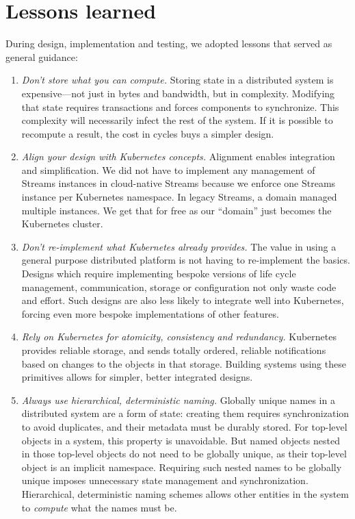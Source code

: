 \section{Lessons learned}
\label{sec:lessons}

During design, implementation and testing, we adopted lessons that
served as general guidance:

\begin{enumerate}
    \item \emph{Don't store what you can compute.} Storing state in a 
        distributed system is expensive---not just in bytes and bandwidth, 
        but in complexity. Modifying that state requires transactions and forces
        components to synchronize. This complexity will necessarily infect the 
        rest of the system. If it is possible to recompute a result, the cost in 
        cycles buys a simpler design.
    \item \emph{Align your design with Kubernetes concepts.} Alignment enables
        integration and simplification. We did not have to implement any
        management of Streams instances in cloud-native Streams because we
        enforce one Streams instance per Kubernetes namespace. In legacy
        Streams, a domain managed multiple instances. We get that for free as
        our ``domain'' just becomes the Kubernetes cluster.
    \item \emph{Don't re-implement what Kubernetes already provides.} The value 
        in using a general purpose distributed platform is not having to 
        re-implement the basics. Designs which require implementing bespoke 
        versions of life cycle management, communication, storage or 
        configuration not only waste code and effort. Such designs are also less 
        likely to integrate well into Kubernetes, forcing even more bespoke 
        implementations of other features.
    \item \emph{Rely on Kubernetes for atomicity, consistency and redundancy.} 
        Kubernetes provides reliable storage, and sends totally ordered, reliable 
        notifications based on changes to the objects in that storage. Building 
        systems using these primitives allows for simpler, better integrated 
        designs.
    \item \emph{Always use hierarchical, deterministic naming.} Globally unique 
        names in a distributed system are a form of state: creating them requires 
        synchronization to avoid duplicates, and their metadata must be durably 
        stored. For top-level objects in a system, this property is 
        unavoidable. But named objects nested in those top-level objects do not
        need to be globally unique, as their top-level object is an implicit 
        namespace. Requiring such nested names to be globally unique imposes 
        unnecessary state management and synchronization. Hierarchical, 
        deterministic naming schemes allows other entities in the system to 
        \emph{compute} what the names must be.
\end{enumerate}

